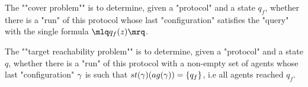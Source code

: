 %			
%			
%		
\begin{definition}

	\AP The ""cover problem"" is to determine, given a "protocol" and a state $q_f$, whether there is a "run" of this protocol whose last "configuration" satisfies the "query" with the single formula $\quotemarks{q_f(\var{z})}$.
	
	\AP The ""target reachability problem"" is to determine, given a "protocol" and a state $q$, whether there is a "run" of this protocol with a non-empty set of agents whose last "configuration" $\gamma$ is such that $\st{\config}(\agentsof{\gamma}) = \{q_f\}$, i.e all agents reached $q_f$.
	
	
\end{definition}

